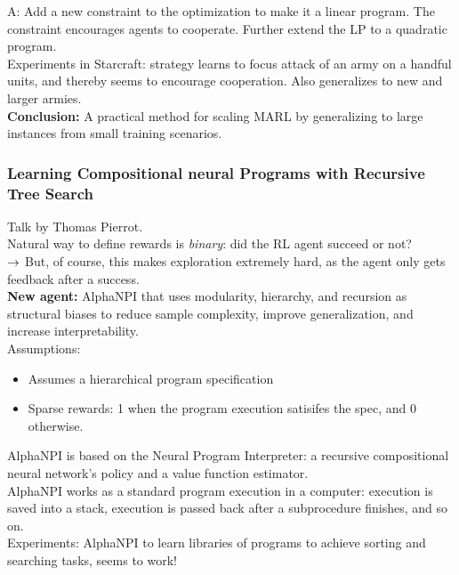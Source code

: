 A: Add a new constraint to the optimization to make it a linear program. The constraint encourages agents to cooperate. Further extend the LP to a quadratic program. \\

Experiments in Starcraft: strategy learns to focus attack of an army on a handful units, and thereby seems to encourage cooperation. Also generalizes to new and larger armies. \\

{\bf Conclusion:} A practical method for scaling MARL by generalizing to large instances from small training scenarios.

\subsubsection{Learning Compositional neural Programs with Recursive Tree Search \cite{carion2019structured}}

Talk by Thomas Pierrot. \\

Natural way to define rewards is {\it binary}: did the RL agent succeed or not? \\

$\rightarrow$ But, of course, this makes exploration extremely hard, as the agent only gets feedback after a success. \\

{\bf New agent:} AlphaNPI that uses modularity, hierarchy, and recursion as structural biases to reduce sample complexity, improve generalization, and increase interpretability. \\

Assumptions:
\begin{itemize}
    \item Assumes a hierarchical program specification
    \item Sparse rewards: 1 when the program execution satisifes the spec, and 0 otherwise.
\end{itemize}

AlphaNPI is based on the Neural Program Interpreter: a recursive compositional neural network's policy and a value function estimator. \\

AlphaNPI works as a standard program execution in a computer: execution is saved into a stack, execution is passed back after a subprocedure finishes, and so on.\\

Experiments: AlphaNPI to learn libraries of programs to achieve sorting and searching tasks, seems to work!


